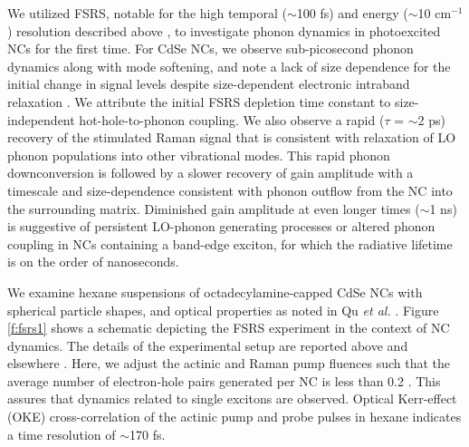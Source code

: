 We utilized FSRS, notable for the high temporal ($\sim$100 fs) and energy ($\sim$10 cm$^{-1}$) resolution described above \cite{doi:10.1146/annurev.physchem.58.032806.104456}, to investigate phonon dynamics in photoexcited NCs for the first time.  For CdSe NCs, we observe sub-picosecond phonon dynamics along with mode softening, and note a lack of size dependence for the initial change in signal levels despite size-dependent electronic intraband relaxation \cite{Wang23032001, doi:10.1021/ja070099a, doi:10.1021/jp9944132}.  We attribute the initial FSRS depletion time constant to size-independent hot-hole-to-phonon coupling. We also observe a rapid ($\tau$ = $\sim$2 ps) recovery of the stimulated Raman signal that is consistent with relaxation of LO phonon populations into other vibrational modes.  This rapid phonon downconversion is followed by a slower recovery of gain amplitude with a timescale and size-dependence consistent with phonon outflow from the NC into the surrounding matrix. Diminished gain amplitude at even longer times ($\sim$1 ns) is suggestive of persistent LO-phonon generating processes or altered phonon coupling in NCs containing a band-edge exciton, for which the radiative lifetime is on the order of nanoseconds. \par

We examine hexane suspensions of octadecylamine-capped CdSe NCs with spherical particle shapes, and optical properties as noted in Qu \emph{et al.} \cite{doi:10.1021/ja017002j}.  Figure \ref{f:fsrs1} shows a schematic depicting the FSRS experiment in the context of NC dynamics.  The details of the experimental setup are reported above and elsewhere \cite{doi:10.1021/jz301107c}.  Here, we adjust the actinic and Raman pump fluences such that the average number of electron-hole pairs generated per NC is less than 0.2 \cite{doi:10.1021/jp9944132}.  This assures that dynamics related to single excitons are observed. Optical Kerr-effect (OKE) cross-correlation of the actinic pump and probe pulses in hexane indicates a time resolution of $\sim$170 fs. \par

